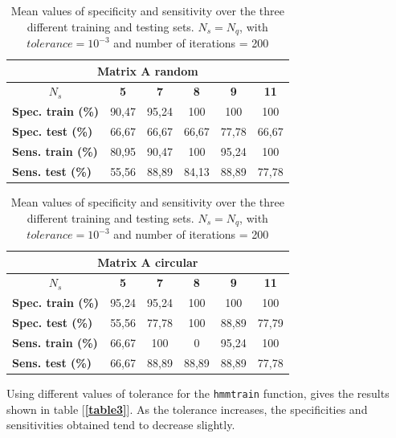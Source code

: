 \documentclass[12pt]{article}
\begin{document}
\begin{table}[H]\tiny
\begin{minipage}[b]{0.5\linewidth}
\begin{tabular}{lccccc}
\hline
\multicolumn{6}{c}{\textbf{Matrix A random}} \\ \hline
\multicolumn{1}{c}{\textbf{$N_{s}$}} & \textbf{5} & \textbf{7} & \textbf{8} & \textbf{9} & \textbf{11} \\ \hline
\textbf{Spec. train (\%)} & 90,47 & 95,24 & 100 & 100 & 100 \\ \hline
\textbf{Spec. test (\%)} & 66,67 & 66,67 & 66,67 & 77,78 & 66,67 \\ \hline
\textbf{Sens. train (\%)} & 80,95 & 90,47 & 100 & 95,24 & 100 \\ \hline
\textbf{Sens. test (\%)} & 55,56 & 88,89 & 84,13 & 88,89 & 77,78 \\ \hline
\end{tabular}
\end{minipage}
\hspace{0.25cm}
\begin{minipage}[b]{0.1\linewidth}
\centering
\begin{tabular}{lccccc}
\hline
\multicolumn{6}{c}{\textbf{Matrix A circular}} \\ \hline
\multicolumn{1}{c}{\textbf{$N_{s}$}} & \textbf{5} & \textbf{7} & \textbf{8} & \textbf{9} & \textbf{11} \\ \hline
\textbf{Spec. train (\%)} & 95,24 & 95,24 & 100 & 100 & 100 \\ \hline
\textbf{Spec. test (\%)} & 55,56 & 77,78 & 100 & 88,89 & 77,79 \\ \hline
\textbf{Sens. train (\%)} & 66,67 & 100 & 0 & 95,24 & 100 \\ \hline
\textbf{Sens. test (\%)} & 66,67 & 88,89 & 88,89 & 88,89 & 77,78 \\ \hline
\end{tabular}\end{minipage}
\caption{Mean values of specificity and sensitivity over the three different training and testing sets. $N_{s} = N_{q}$, with $tolerance = 10^{-3}$ and number of iterations = 200}
\label{table1}
\end{table}

Using different values of tolerance for the \texttt{hmmtrain} function, gives the results shown in table [{\textbf{\ref{table3}}}]. As the tolerance increases, the specificities and sensitivities obtained tend to decrease slightly. 
\end{document}
